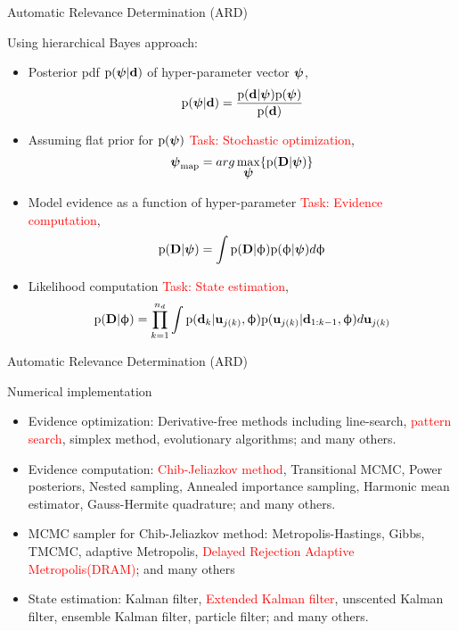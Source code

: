 \documentclass[xcolor=dvipsnames,10pt]{beamer}
\newcommand{\df}{\displaystyle\frac}
\def\bpsi{\mbox{\boldmath $\psi$}}
\newcommand{\M}{\mathcal{M}}
\def\prob{\mbox{$\text{p}$}}
\def\bx{\mbox{\bf u}}
\def\bxjk{\mbox{$\bx_{j(k)}$}}
\def\bd{\mbox{\bf d}}
\def\bdk{\mbox{$\bd_k$}}
\def\bdtokm{\mbox{$\bd_{1:k-1}$}}
\def\bdn{\mbox{$\bD$}}
\def\nd{\ensuremath{n_{d}}}
\def\bD{\mbox{\bf D}}
\def\bphi{\mbox{\ensuremath{\upphi}}}
\newcommand{\beq}{\begin{equation}}
\newcommand{\eeq}{\end{equation}}
\def\smap{\ensuremath{\bpsi_{\text{map}}}}
\newcommand{\alertb}[1]{\begin{center}\alert{#1}\end{center}}
\newcommand{\red}[1]{{\textcolor{red}{#1}}}
\newenvironment{newblockc}[1]
{\begin{block}{#1}\begin{itemize}\small
  \setlength{\itemsep}{4pt}}
{\end{itemize}\end{block}}
\newcommand{\itb}[1]{\item #1}
\begin{document}
\begin{frame}{Automatic Relevance Determination (ARD)}
\begin{newblockc}{Using hierarchical Bayes approach:}
\itb{Posterior pdf $\prob(\bpsi|\bd)$ of hyper-parameter vector $\bpsi$,
\beq
\prob(\bpsi|\bd) = \df{\prob(\bd|\bpsi) \prob(\bpsi)}{\prob(\bd)}
\eeq}
\itb{Assuming flat prior for $\prob(\bpsi)$ \red{Task: Stochastic optimization},
\beq
\smap = arg  \max_{\bpsi} \{\prob(\bdn|\bpsi)\}
\eeq}
\itb{Model evidence as a function of hyper-parameter \red{Task: Evidence computation},
\beq \label{eq:evidence_int} \prob(\bdn|\bpsi) = \int \prob(\bdn|\bphi) \prob(\bphi|\bpsi) d \bphi 
\eeq}
\itb{Likelihood computation \red{Task: State estimation},
\beq 
\prob(\bdn|\bphi) = \prod_{k=1}^{\nd} \int \prob(\bdk|\bxjk,\bphi) \prob(\bxjk|\bdtokm,\bphi) d
\bxjk
\eeq}
\end{newblockc}
\end{frame}

\begin{frame}{Automatic Relevance Determination (ARD)}
\begin{newblockc}{Numerical implementation}
\itb{Evidence optimization: Derivative-free methods including line-search, \red{pattern search}, simplex method, evolutionary algorithms; and many others.}
\itb{Evidence computation: \red{Chib-Jeliazkov method}, Transitional MCMC, Power posteriors, Nested sampling, Annealed importance sampling, Harmonic mean estimator, Gauss-Hermite quadrature; and many others.}
\itb{MCMC sampler for Chib-Jeliazkov method: Metropolis-Hastings, Gibbs, TMCMC, adaptive Metropolis, \red{Delayed Rejection Adaptive Metropolis(DRAM)}; and many others}
\itb{State estimation: Kalman filter, \red{Extended Kalman filter}, unscented Kalman filter, ensemble Kalman filter, particle filter; and many others. }
\end{newblockc}
\end{frame}
\end{document}
